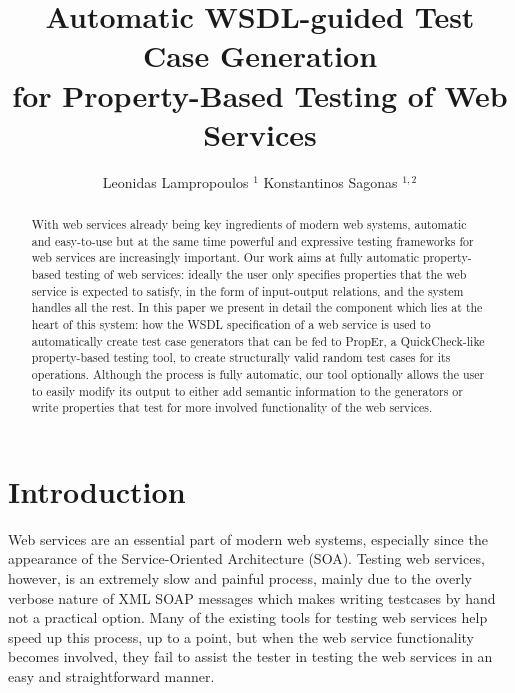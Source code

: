 \documentclass[submission,copyright]{eptcs}
\title{Automatic WSDL-guided Test Case Generation\\
       for Property-Based Testing of Web Services}
\author{Leonidas Lampropoulos $^{1}$ \hspace*{1em} Konstantinos Sagonas $^{1,2}$
\institute{%
  $^{1}$ School of Electrical and Computer Engineering,
  National Technical University of Athens, Greece\\
  $^{2}$ Department of Information Technology, Uppsala University, Sweden
}
}
\begin{document}
\maketitle

\begin{abstract}
With web services already being key ingredients of modern web systems,
automatic and easy-to-use but at the same time powerful and expressive
testing frameworks for web services are increasingly important. Our
work aims at fully automatic property-based testing of web services:
ideally the user only specifies properties that the web service is
expected to satisfy, in the form of input-output relations, and the
system handles all the rest. In this paper we present in detail the
component which lies at the heart of this system: how the WSDL
specification of a web service is used to automatically create test
case generators that can be fed to PropEr, a QuickCheck-like
property-based testing tool, to create structurally valid random
test cases for its operations. Although the process is fully automatic,
our tool optionally allows the user to easily modify its output to
either add semantic information to the generators or write properties
that test for more involved functionality of the web services.
\end{abstract}


\section{Introduction} \label{sec:intro}


Web services are an essential part of modern web systems, especially
since the appearance of the Service-Oriented Architecture (SOA).
Testing web services, however, is an extremely slow and painful
process, mainly due to the overly verbose nature of XML SOAP messages
which makes writing testcases by hand not a practical option. Many of
the existing tools for testing web services help speed up this
process, up to a point, but when the web service functionality becomes
involved, they fail to assist the tester in testing the web services
in an easy and straightforward manner.

\end{document}
